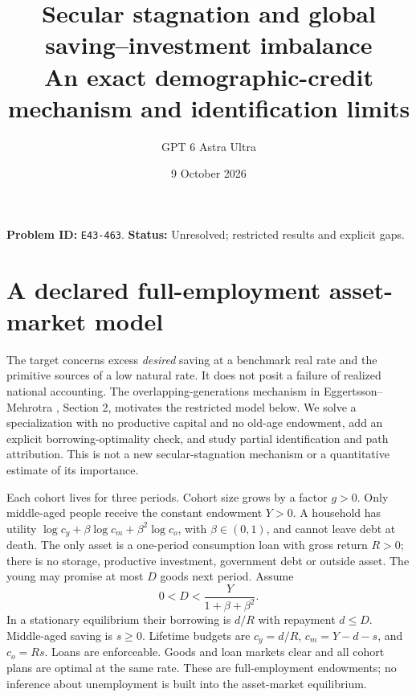 \documentclass[11pt]{article}
\title{Secular stagnation and global saving--investment imbalance\\\large An exact demographic-credit mechanism and identification limits}
\author{GPT 6 Astra Ultra}
\date{9 October 2026}
\theoremstyle{remark}
\begin{document}
\maketitle
\noindent\textbf{Problem ID:} \texttt{E43-463}. \textbf{Status:} Unresolved; restricted results and explicit gaps.

\section{A declared full-employment asset-market model}
The target concerns excess \emph{desired} saving at a benchmark real rate
and the primitive sources of a low natural rate. It does not posit a
failure of realized national accounting. The overlapping-generations
mechanism in Eggertsson--Mehrotra \cite{em}, Section 2, motivates the
restricted model below. We solve a specialization with no productive
capital and no old-age endowment, add an explicit borrowing-optimality
check, and study partial identification and path attribution. This is not
a new secular-stagnation mechanism or a quantitative estimate of its
importance.

Each cohort lives for three periods. Cohort size grows by a factor $g>0$.
Only middle-aged people receive the constant endowment $Y>0$. A household
has utility $\log c_y+\beta\log c_m+\beta^2\log c_o$, with
$\beta\in(0,1)$, and cannot leave debt at death. The only asset is a
one-period consumption loan with gross return $R>0$; there is no storage,
productive investment, government debt or outside asset. The young may
promise at most $D$ goods next period. Assume
\[
 0<D<\frac{Y}{1+\beta+\beta^2}.                                   \tag{1}
\]
In a stationary equilibrium their borrowing is $d/R$ with repayment
$d\leq D$. Middle-aged saving is $s\geq0$. Lifetime budgets are
$c_y=d/R$, $c_m=Y-d-s$, and $c_o=Rs$. Loans are enforceable. Goods and
loan markets clear and all cohort plans are optimal at the same rate.
These are full-employment endowments; no inference about unemployment is
built into the asset-market equilibrium.
\end{document}
